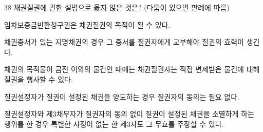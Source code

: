 \begin{question}{38}
채권질권에 관한 설명으로 옳지 않은 것은? (다툼이 있으면 판례에 따름)
\begin{choices}
  \item 임차보증금반환청구권은 채권질권의 목적이 될 수 있다.
  \item 채권증서가 있는 지명채권의 경우 그 증서를 질권자에게 교부해야 질권의 효력이 생긴다.
  \item 채권의 목적물이 금전 이외의 물건인 때에는 채권질권자는 직접 변제받은 물건에 대해 질권을 행사할 수 있다.
  \item 질권설정자가 질권이 설정된 채권을 양도하는 경우 질권자의 동의는 필요 없다.
  \item 질권설정자와 제3채무자가 질권자의 동의 없이 질권이 설정된 채권을 소멸하게 하는 행위를 한 경우 특별한 사정이 없는 한 제3자도 그 무효를 주장할 수 있다.
\end{choices}
\end{question}

